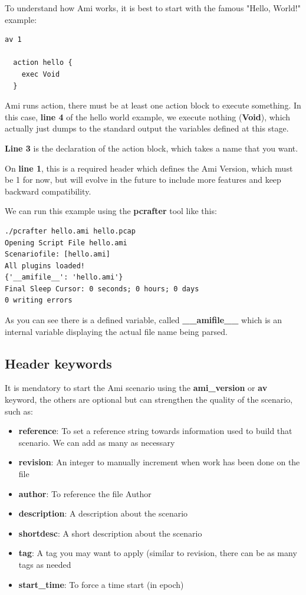 \documentclass[10pt]{article}
\begin{document}
To understand how Ami works, it is best to start with the famous "Hello, World!" example:
\begin{lstlisting}[caption={Hello world in Ami},captionpos=b]
  av 1

  action hello {
    exec Void
  }
\end{lstlisting}

Ami runs action, there must be at least one action block to execute something. In this case, \textbf{line 4} of the hello world example, we execute nothing (\textbf{Void}), which actually just dumps to the standard output the variables defined at this stage.

\textbf{Line 3} is the declaration of the action block, which takes a name that you want.

On \textbf{line 1}, this is a required header which defines the Ami Version, which must be 1 for now, but will evolve in the future to include more features and keep backward compatibility.

We can run this example using the \textbf{pcrafter} tool like this:
\begin{lstlisting}[caption={Running Hello world},captionpos=b]
./pcrafter hello.ami hello.pcap
Opening Script File hello.ami
Scenariofile: [hello.ami]
All plugins loaded!
{'__amifile__': 'hello.ami'}
Final Sleep Cursor: 0 seconds; 0 hours; 0 days
0 writing errors
\end{lstlisting}

As you can see there is a defined variable, called \textbf{\_\_amifile\_\_} which is an internal variable displaying the actual file name being parsed.

\subsection{Header keywords}

It is mendatory to start the Ami scenario using the \textbf{ami\_version} or \textbf{av} keyword, the others are optional but can strengthen the quality of the scenario, such as:

\begin{itemize}
\item \textbf{reference}: To set a reference string towards information used to build that scenario. We can add as many as necessary
\item \textbf{revision}: An integer to manually increment when work has been done on the file
\item \textbf{author}: To reference the file Author
\item \textbf{description}: A description about the scenario
\item \textbf{shortdesc}: A short description about the scenario
\item \textbf{tag}: A tag you may want to apply (similar to revision, there can be as many tags as needed
\item \textbf{start\_time}: To force a time start (in epoch)
\end{itemize}
\end{document}
